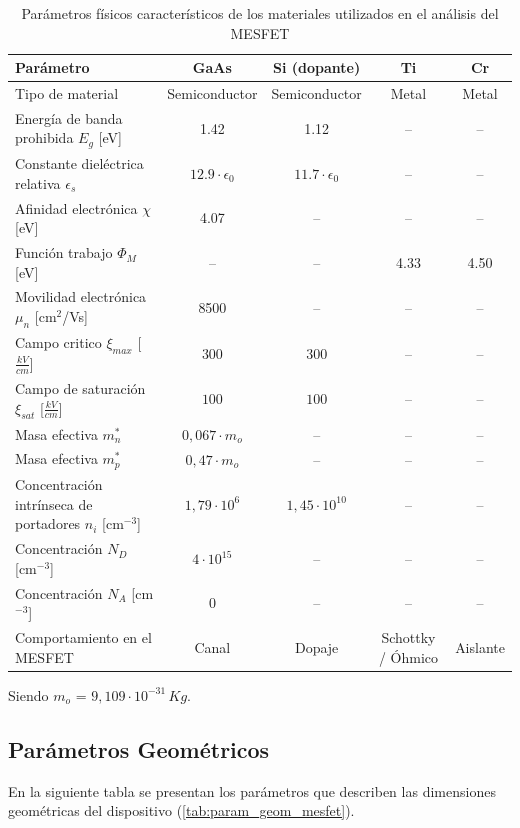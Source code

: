 \documentclass[a4paper]{article}
\begin{document}
\begin{table}[H]
	\centering
	\caption{Parámetros físicos característicos de los materiales utilizados en el análisis del MESFET}
	\label{tab:param_fis_mesfet}
	\begin{tabular}{|l|c|c|c|c|}
		\hline
		\textbf{Parámetro} & \textbf{GaAs} & \textbf{Si (dopante)} & \textbf{Ti} & \textbf{Cr} \\ \hline
		Tipo de material & Semiconductor & Semiconductor & Metal & Metal \\ \hline
		Energía de banda prohibida $E_g$ [eV] & 1.42 & 1.12 & -- & -- \\ \hline
		Constante dieléctrica relativa $\epsilon_s$ & $12.9\cdot \epsilon_0$ & $11.7\cdot \epsilon_0$ & -- & -- \\ \hline
		Afinidad electrónica $\chi$ [eV] & 4.07 & -- & -- & -- \\ \hline
		Función trabajo $\Phi_M$ [eV] & -- & -- & 4.33 & 4.50 \\ \hline
		Movilidad electrónica $\mu_n$ [cm$^2$/Vs] & 8500 & -- & -- & -- \\ \hline
		Campo critico $\xi_{max}$ [$\frac{kV}{cm}$] & $300$ & $300$ & -- & -- \\ \hline
		Campo de saturación $\xi_{sat}$ [$\frac{kV}{cm}$] & $100$ & $100$ & -- & -- \\ \hline
		Masa efectiva ${m}^*_n$ &$0,067\cdot m_o$ & -- & -- & -- \\ \hline
		Masa efectiva ${m}^*_p$  &$0,47\cdot m_o$& -- & -- & -- \\ \hline
		Concentración intrínseca de portadores $n_i$ [cm$^{-3}$] & $1,79 \cdot 10^{6}$ &  $1,45 \cdot 10^{10}$ & -- & -- \\ \hline
		Concentración  $N_D$ [cm$^{-3}$] & $4 \cdot 10 ^{15}$ & -- & -- & -- \\ \hline
		Concentración  $N_A$ [cm$^{-3}$] & 0 &--& -- & -- \\ \hline
		Comportamiento en el MESFET & Canal & Dopaje & Schottky / Óhmico & Aislante \\ \hline
	\end{tabular}
\end{table}

Siendo $m_o$ = $9,109 \cdot 10^{-31} \,Kg $.

\subsection{Parámetros Geométricos}

En la siguiente tabla se presentan los parámetros que describen las dimensiones geométricas del dispositivo (\ref{tab:param_geom_mesfet}). 
\end{document}
